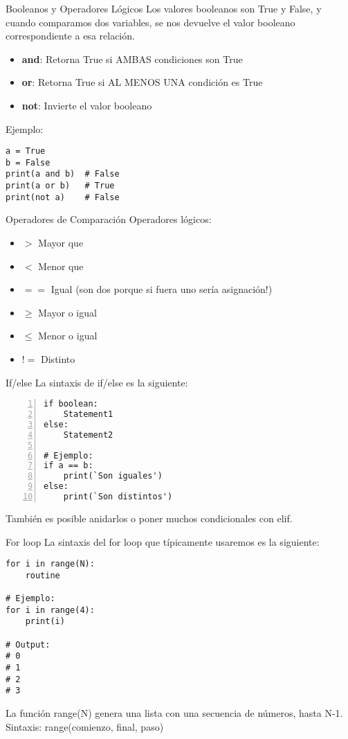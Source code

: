 \documentclass{beamer}
\begin{document}
\begin{frame}[fragile]{Booleanos y Operadores Lógicos}
Los valores booleanos son True y False, y cuando comparamos dos variables, se nos devuelve el valor booleano correspondiente a esa relación.
\begin{itemize}
    \item \textbf{and}: Retorna True si AMBAS condiciones son True
    \item \textbf{or}: Retorna True si AL MENOS UNA condición es True
    \item \textbf{not}: Invierte el valor booleano
\end{itemize}
    
Ejemplo:
\begin{lstlisting}
a = True
b = False
print(a and b)  # False
print(a or b)   # True
print(not a)    # False
\end{lstlisting}
\end{frame}

\begin{frame}[fragile]{Operadores de Comparación}
Operadores lógicos:
\begin{itemize}
    \item $>$ Mayor que
    \item $<$ Menor que
    \item $==$ Igual (son dos porque si fuera uno sería asignación!)
    \item $\geq$ Mayor o igual
    \item $\leq$ Menor o igual
    \item $!=$ Distinto
\end{itemize}
\end{frame}

\begin{frame}[fragile]{If/else}
La sintaxis de if/else es la siguiente:

\begin{lstlisting}[numbers=left, numbersep=5pt]
if boolean:
    Statement1
else:
    Statement2

# Ejemplo:
if a == b:
    print(`Son iguales')
else:
    print(`Son distintos')
\end{lstlisting}

También es posible anidarlos o poner muchos condicionales con elif.
\end{frame}

\begin{frame}[fragile]{For loop}
La sintaxis del for loop que típicamente usaremos es la siguiente:

\begin{lstlisting}
for i in range(N):
    routine

# Ejemplo:
for i in range(4):
    print(i)

# Output:
# 0
# 1
# 2
# 3
\end{lstlisting}

La función range(N) genera una lista con una secuencia de números, hasta N-1.\\
Sintaxis: range(comienzo, final, paso)
\end{frame}
\end{document}
